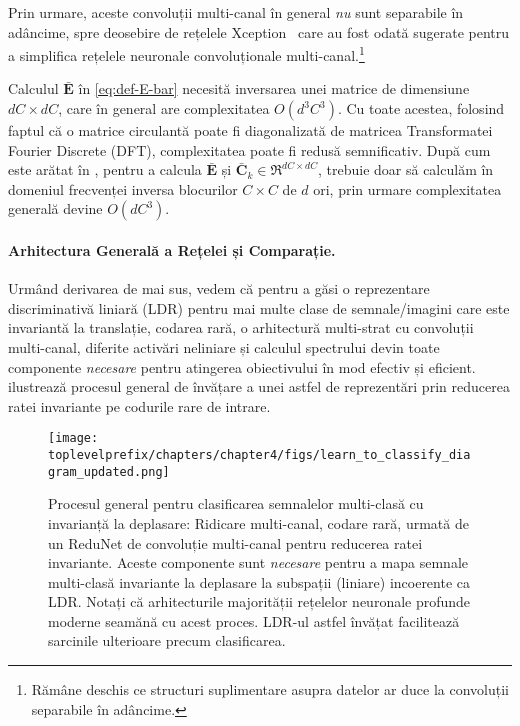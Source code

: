 \documentclass[../../book-main_ro.tex]{subfiles}
\begin{document}
Prin urmare, aceste convoluții multi-canal în general {\em nu} sunt separabile în adâncime, spre deosebire de rețelele Xception~\cite{Xception} care au fost odată sugerate pentru a simplifica rețelele neuronale convoluționale multi-canal.\footnote{Rămâne deschis ce structuri suplimentare asupra datelor ar duce la convoluții separabile în adâncime.} 

\begin{remark} 
Calculul $\bar{\bm E}$ în \eqref{eq:def-E-bar} necesită inversarea unei matrice de dimensiune $dC \times dC$, care în general are complexitatea $O(d^3C^3)$. Cu toate acestea, folosind faptul că o matrice circulantă poate fi diagonalizată de matricea Transformatei Fourier Discrete (DFT), complexitatea poate fi redusă semnificativ. După cum este arătat în \cite{chan2021redunet}, pentru a calcula $\bar{\bm E}$ și $\bar{\bm C}_k \in \Re^{dC \times dC}$, trebuie doar să calculăm în domeniul frecvenței inversa blocurilor $C\times C$ de $d$ ori, prin urmare complexitatea generală devine $O(dC^3)$.
    
\end{remark}




\paragraph{Arhitectura Generală a Rețelei și Comparație.} 
Urmând derivarea de mai sus, vedem că pentru a găsi o reprezentare discriminativă liniară (LDR) pentru mai multe clase de semnale/imagini care este invariantă la translație, codarea rară, o arhitectură multi-strat cu convoluții multi-canal, diferite activări neliniare și calculul spectrului devin toate componente {\em necesare} pentru atingerea obiectivului în mod efectiv și eficient.  ilustrează procesul general de învățare a unei astfel de reprezentări prin reducerea ratei invariante pe codurile rare de intrare. 

\begin{figure}[t]
    \centering
    \texttt{[image: \\toplevelprefix/chapters/chapter4/figs/learn\_to\_classify\_diagram\_updated.png]}
    \caption{Procesul general pentru clasificarea semnalelor multi-clasă cu invarianță la deplasare: Ridicare multi-canal, codare rară, urmată de un ReduNet de convoluție multi-canal pentru reducerea ratei invariante. Aceste componente sunt {\em necesare} pentru a mapa semnale multi-clasă invariante la deplasare la subspații (liniare) incoerente ca LDR. Notați că arhitecturile majorității rețelelor neuronale profunde moderne seamănă cu acest proces. LDR-ul astfel învățat facilitează sarcinile ulterioare precum clasificarea.}
    \label{fig:learn-to-classify-diagram}
\end{figure}
\end{document}
